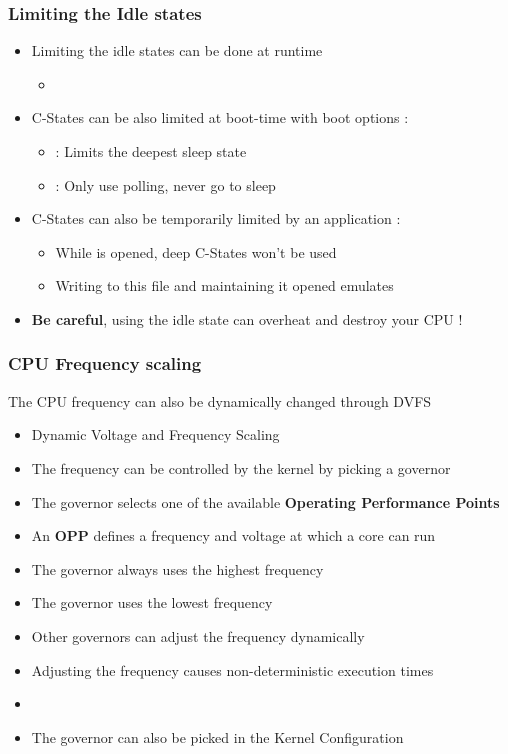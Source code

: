 \begin{frame}
	\frametitle{Limiting the Idle states}
	\begin{itemize}
		\item Limiting the idle states can be done at runtime
			\begin{itemize}
				\item {}
			\end{itemize}
		\item C-States can be also limited at boot-time with boot options :
			\begin{itemize}
				\item {} : Limits the deepest sleep state
				\item {} : Only use polling, never go to sleep
			\end{itemize}
		\item C-States can also be temporarily limited by an application :
			\begin{itemize}
				\item While  is opened, deep C-States won't be used
				\item Writing  to this file and maintaining it opened emulates 
			\end{itemize}
		\item \textbf{Be careful}, using the  idle state can overheat and destroy your CPU !
	\end{itemize}
\end{frame}

\begin{frame}
	\frametitle{CPU Frequency scaling}
	The CPU frequency can also be dynamically changed through DVFS
	\begin{itemize}
		\item Dynamic Voltage and Frequency Scaling
		\item The frequency can be controlled by the kernel by picking a governor
		\item The governor selects one of the available \textbf{Operating Performance Points}
		\item An \textbf{OPP} defines a frequency and voltage at which a core can run
		\item The  governor always uses the highest frequency
		\item The  governor uses the lowest frequency
		\item Other governors can adjust the frequency dynamically
		\item Adjusting the frequency causes non-deterministic execution times
		\item {}
		\item The governor can also be picked in the Kernel Configuration
	\end{itemize}
\end{frame}

